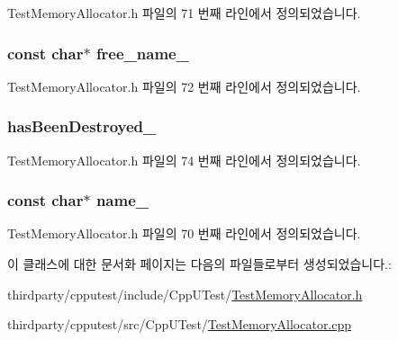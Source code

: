 Test\+Memory\+Allocator.\+h 파일의 71 번째 라인에서 정의되었습니다.

\subsubsection[{\texorpdfstring{free\+\_\+name\+\_\+}{free_name_}}]{\setlength{\rightskip}{0pt plus 5cm}const char$\ast$ free\+\_\+name\+\_\+\hspace{0.3cm}{\ttfamily [protected]}}\hypertarget{class_test_memory_allocator_a4f7ece205625129df190e624cccf9286}{}\label{class_test_memory_allocator_a4f7ece205625129df190e624cccf9286}


Test\+Memory\+Allocator.\+h 파일의 72 번째 라인에서 정의되었습니다.

\subsubsection[{\texorpdfstring{has\+Been\+Destroyed\+\_\+}{hasBeenDestroyed_}}]{ has\+Been\+Destroyed\+\_\+\hspace{0.3cm}{\ttfamily [protected]}}\hypertarget{class_test_memory_allocator_a971604f223534e64d5024d63396b397a}{}\label{class_test_memory_allocator_a971604f223534e64d5024d63396b397a}


Test\+Memory\+Allocator.\+h 파일의 74 번째 라인에서 정의되었습니다.

\subsubsection[{\texorpdfstring{name\+\_\+}{name_}}]{\setlength{\rightskip}{0pt plus 5cm}const char$\ast$ name\+\_\+\hspace{0.3cm}{\ttfamily [protected]}}\hypertarget{class_test_memory_allocator_a7dac8366c11fbcad2f49d85fe8fc4fbe}{}\label{class_test_memory_allocator_a7dac8366c11fbcad2f49d85fe8fc4fbe}


Test\+Memory\+Allocator.\+h 파일의 70 번째 라인에서 정의되었습니다.



이 클래스에 대한 문서화 페이지는 다음의 파일들로부터 생성되었습니다.\+:\begin{DoxyCompactItemize}
\item 
thirdparty/cpputest/include/\+Cpp\+U\+Test/\hyperlink{_test_memory_allocator_8h}{Test\+Memory\+Allocator.\+h}\item 
thirdparty/cpputest/src/\+Cpp\+U\+Test/\hyperlink{_test_memory_allocator_8cpp}{Test\+Memory\+Allocator.\+cpp}\end{DoxyCompactItemize}
